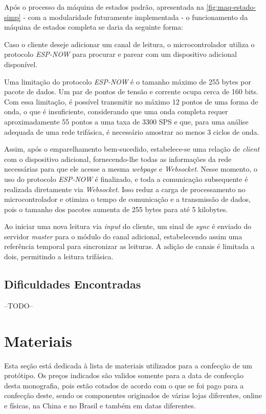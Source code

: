 Após o processo da máquina de estados padrão, apresentada na \autoref{fig:maq-estado-simp} - com a modularidade futuramente implementada - o funcionamento da máquina de estados completa se daria da seguinte forma:

Caso o cliente deseje adicionar um canal de leitura, o microcontrolador utiliza o protocolo \textit{ESP-NOW} para procurar e parear com um dispositivo adicional disponível.

Uma limitação do protocolo \textit{ESP-NOW} é o tamanho máximo de 255 bytes por pacote de dados. Um par de pontos de tensão e corrente ocupa cerca de 160 bits. Com essa limitação, é possível transmitir no máximo 12 pontos de uma forma de onda, o que é insuficiente, considerando que uma onda completa requer aproximadamente 55 pontos a uma taxa de 3300 \gls{SPS} e que, para uma análise adequada de uma rede trifásica, é necessário amostrar ao menos 3 ciclos de onda.

Assim, após o emparelhamento bem-sucedido, estabelece-se uma relação de \textit{client} com o dispositivo adicional, fornecendo-lhe todas as informações da rede necessárias para que ele acesse a mesma \textit{webpage} e \textit{Websocket}. Nesse momento, o uso do protocolo \textit{ESP-NOW} é finalizado, e toda a comunicação subsequente é realizada diretamente via \textit{Websocket}. Isso reduz a carga de processamento no microcontrolador e otimiza o tempo de comunicação e a transmissão de dados, pois o tamanho dos pacotes aumenta de 255 bytes para até 5 kilobytes.

Ao iniciar uma nova leitura via \textit{input} do cliente, um sinal de \textit{sync} é enviado do servidor \textit{master} para o módulo do canal adicional, estabelecendo assim uma referência temporal para sincronizar as leituras. A adição de canais é limitada a dois, permitindo a leitura trifásica.

\subsection{Dificuldades Encontradas}\label{dificuldades-metodologia}
--TODO--

\section{Materiais}\label{sec:materiais}

Esta seção está dedicada à lista de materiais utilizados para a confecção de um protótipo. Os preços indicados são validos somente para a data de confecção desta monografia, pois estão cotados de acordo com o que se foi pago para a confecção deste, sendo os componentes originados de várias lojas diferentes, online e físicas, na China e no Brasil e também em datas diferentes.

